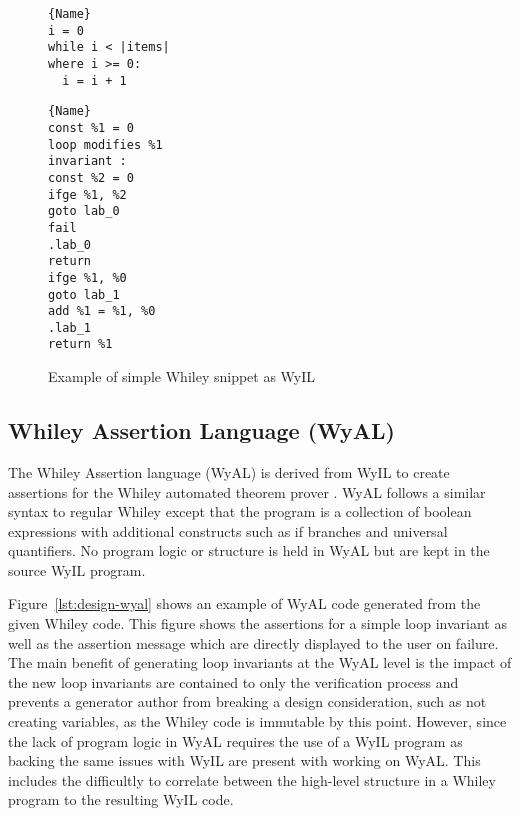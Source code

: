\begin{figure}
\noindent\begin{minipage}{.45\textwidth}
\begin{lstlisting}[caption={Whiley Code},frame=tlrb,numbers=none]{Name}
i = 0
while i < |items|
where i >= 0:
  i = i + 1
\end{lstlisting}
\end{minipage}\hfill
\begin{minipage}{.45\textwidth}
\begin{lstlisting}[caption={WyIL Code},frame=tlrb,numbers=none]{Name}
const %1 = 0
loop modifies %1
invariant :
const %2 = 0
ifge %1, %2
goto lab_0
fail
.lab_0
return
ifge %1, %0
goto lab_1
add %1 = %1, %0
.lab_1
return %1
\end{lstlisting}
\end{minipage}
\caption{Example of simple Whiley snippet as WyIL}
\label{lst:design-wyil}
\end{figure}

\subsection{Whiley Assertion Language (WyAL)}

The Whiley Assertion language (WyAL) is derived from WyIL to create
assertions for the Whiley automated theorem prover \cite{wyal}.
WyAL follows a similar syntax to regular Whiley except that the program
is a collection of boolean expressions with additional constructs such as
if branches and universal quantifiers.
No program logic or structure is held in WyAL but are kept in the source
WyIL program.

Figure~\ref{lst:design-wyal} shows an example of WyAL code generated from
the given Whiley code.
This figure shows the assertions for a simple loop invariant as well as the
assertion message which are directly displayed to the user on failure.
The main benefit of generating loop invariants at the WyAL level is the
impact of the new loop invariants are contained to only the verification
process and prevents a generator author from breaking a design consideration,
such as not creating variables, as the Whiley code is immutable by this point.
However, since the lack of program logic in WyAL requires the use of a WyIL program
as backing the same issues with WyIL are present with working on WyAL.
This includes the difficultly to correlate between the high-level structure
in a Whiley program to the resulting WyIL code.

